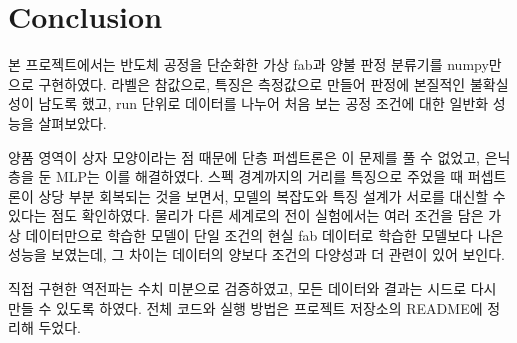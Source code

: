 \documentclass[10pt,twocolumn,a4paper]{article}
\begin{document}
\section{Conclusion}

본 프로젝트에서는 반도체 공정을 단순화한 가상 fab과 양불 판정 분류기를 numpy만으로 구현하였다.
라벨은 참값으로, 특징은 측정값으로 만들어 판정에 본질적인 불확실성이 남도록 했고, run 단위로
데이터를 나누어 처음 보는 공정 조건에 대한 일반화 성능을 살펴보았다.

양품 영역이 상자 모양이라는 점 때문에 단층 퍼셉트론은 이 문제를 풀 수 없었고, 은닉층을 둔
MLP는 이를 해결하였다. 스펙 경계까지의 거리를 특징으로 주었을 때 퍼셉트론이 상당 부분
회복되는 것을 보면서, 모델의 복잡도와 특징 설계가 서로를 대신할 수 있다는 점도 확인하였다.
물리가 다른 세계로의 전이 실험에서는 여러 조건을 담은 가상 데이터만으로 학습한 모델이 단일
조건의 현실 fab 데이터로 학습한 모델보다 나은 성능을 보였는데, 그 차이는 데이터의 양보다 조건의
다양성과 더 관련이 있어 보인다.

직접 구현한 역전파는 수치 미분으로 검증하였고, 모든 데이터와 결과는 시드로 다시 만들 수 있도록
하였다. 전체 코드와 실행 방법은 프로젝트 저장소의 README에 정리해 두었다.
\end{document}
